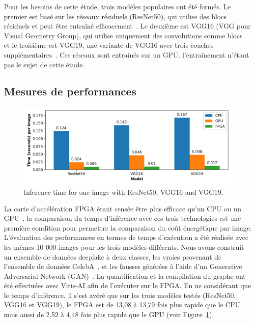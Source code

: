 Pour les besoins de cette étude, trois modèles populaires ont été formés. Le premier est basé sur les réseaux résiduels (ResNet50), qui utilise des blocs résiduels et peut être entraîné efficacement~\cite{NEURIPS2019_7716d0fc}. Le deuxième est VGG16 (VGG pour Visual Geometry Group), qui utilise uniquement des convolutions comme blocs~\cite{DBLP:journals/corr/SimonyanZ14a} et le troisième est VGG19, une variante de VGG16 avec trois couches supplémentaires~\cite{biom10070984}. Ces réseaux sont entraînés sur un GPU, l'entraînement n'étant pas le sujet de cette étude.

\subsection{Mesures de performances}

\begin{figure}[t]
\centering
\includegraphics[width=\columnwidth]{4_Chapitre4/figures/characterization/time_of_inference_1_image.png}
\caption{Inference time for one image with ResNet50, VGG16 and VGG19.}
\label{figure:herofake-time-inference}
\end{figure}

La carte d'accélération FPGA étant censée être plus efficace qu'un CPU ou un GPU~\cite{5272532}, la comparaison du temps d'inférence avec ces trois technologies est une première condition pour permettre la comparaison du coût énergétique par image. L'évaluation des performances en termes de temps d'exécution a été réalisée avec les mêmes 10 000 images pour les trois modèles différents. Nous avons construit un ensemble de données deepfake à deux classes, les vraies provenant de l'ensemble de données CelebA~\cite{https://doi.org/10.48550/arxiv.1411.7766}, et les fausses générées à l'aide d'un Generative Adversarial Network (GAN)~\cite{jimaging7080128}. La quantification et la compilation du graphe ont été effectuées avec Vitis-AI afin de l'exécuter sur le FPGA. En ne considérant que le temps d'inférence, il s'est avéré que sur les trois modèles testés (ResNet50, VGG16 et VGG19), le FPGA est de 13,08 à 13,79 fois plus rapide que le CPU mais aussi de 2,52 à 4,48 fois plus rapide que le GPU (voir Figure~\ref{figure:herofake-time-inference}).

